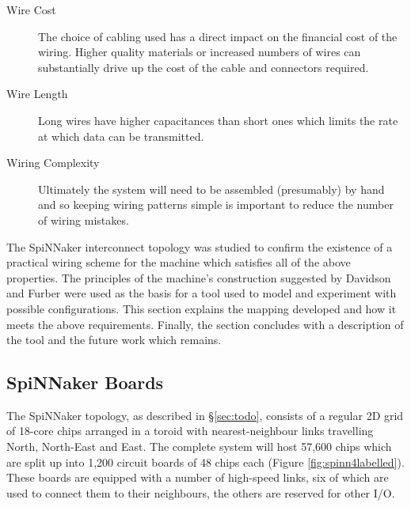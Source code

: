 		\begin{description}
			
			\item[Wire Cost] The choice of cabling used has a direct impact on the
			financial cost of the wiring. Higher quality materials or increased
			numbers of wires can substantially drive up the cost of the cable and
			connectors required.
			
			\item[Wire Length] Long wires have higher capacitances than short ones
			which limits the rate at which data can be transmitted.
			
			\item[Wiring Complexity] Ultimately the system will need to be assembled
			(presumably) by hand and so keeping wiring patterns simple is important to
			reduce the number of wiring mistakes.
			
		\end{description}
		
		The SpiNNaker interconnect topology was studied to confirm the existence of
		a practical wiring scheme for the machine which satisfies all of the above
		properties. The principles of the machine's construction suggested by
		Davidson \cite{davidsonWiring} and Furber \cite{furber13email} were used as
		the basis for a tool used to model and experiment with possible
		configurations. This section explains the mapping developed and how it
		meets the above requirements. Finally, the section concludes with a
		description of the tool and the future work which remains.
		
		\subsection{SpiNNaker Boards}
			
			
			
			The SpiNNaker topology, as described in \S\ref{sec:todo}, consists of a
			regular 2D grid of 18-core chips arranged in a toroid with
			nearest-neighbour links travelling North, North-East and East. The
			complete system will host 57,600 chips which are split up into 1,200
			circuit boards of 48 chips each (Figure \ref{fig:spinn4labelled}). These
			boards are equipped with a number of high-speed links, six of which are
			used to connect them to their neighbours, the others are reserved for
			other I/O.
			
